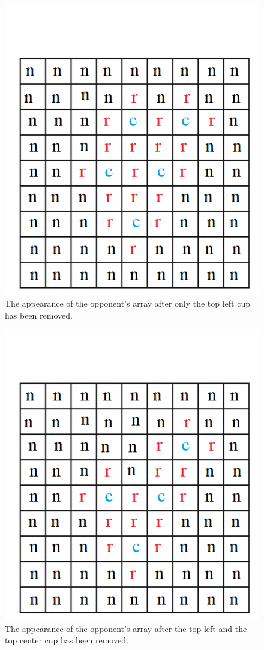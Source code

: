 \documentclass{article}
\begin{document}
\begin{figure}
	\centering
	\includegraphics[width=0.7\linewidth]{cupremoval}
	\caption{The appearance of the opponent's array after only the top left cup has been removed.}
	\label{cupremoval}
\end{figure}

\begin{figure}
	\centering
	\includegraphics[width=0.7\linewidth]{2cupsremoved}
	\caption{The appearance of the opponent's array after the top left and the top center cup has been removed.}
	\label{2cupsremoved}
\end{figure}
\end{document}
